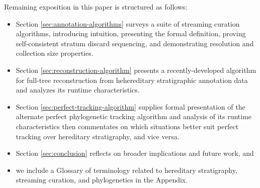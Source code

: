
Remaining exposition in this paper is structured as follows:
\begin{itemize}
\item Section \ref{sec:annotation-algorithms} surveys a suite of streaming curation algorithms, introducing intuition, presenting the formal definition, proving self-consistent stratum discard sequencing, and demonstrating resolution and collection size properties.
\item Section \ref{sec:reconstruction-algorithm} presents a recently-developed algorithm for full-tree reconstruction from hehereditary stratigraphic annotation data and analyzes its runtime characteristics.
\item Section \ref{sec:perfect-tracking-algorithm} supplies formal presentation of the alternate perfect phylogenetic tracking algorithm and analysis of its runtime characteristics then commentates on which situations better suit perfect tracking over hereditary stratigraphy, and vice versa.
\item Section \ref{sec:conclusion} reflects on broader implications and future work, and
\item we include a Glossary of terminology related to hereditary stratigraphy, streaming curation, and phylogenetics in the Appendix.
\end{itemize}
